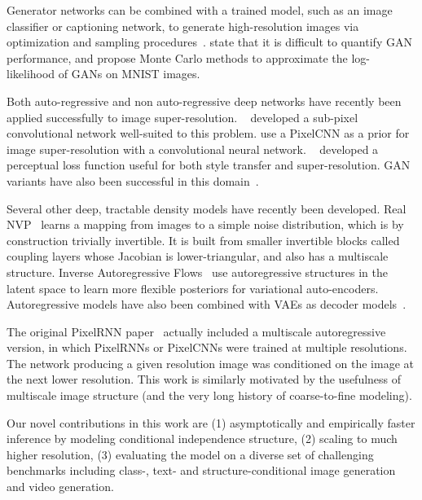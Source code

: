 \documentclass{article}
\begin{document}
Generator networks can be combined with a trained model, such as an image classifier or captioning network, to generate high-resolution images via optimization and sampling procedures~\cite{nguyen2016plug}.
\citet{Wu2017on} state that it is difficult to quantify GAN performance, and propose Monte Carlo methods to approximate the log-likelihood of GANs on MNIST images. 



Both auto-regressive and non auto-regressive deep networks have recently been applied successfully to image super-resolution.
~\citet{shi2016real} developed a sub-pixel convolutional network well-suited to this problem.
\citet{dahl2017pixel} use a PixelCNN as a prior for image super-resolution with a convolutional neural network.
~\citet{johnson2016perceptual} developed a perceptual loss function useful for both style transfer and super-resolution.
GAN variants have also been successful in this domain~\cite{Ledig2016arxiv,sonderby2016amortised}.


Several other deep, tractable density models have recently been developed.
Real NVP~\citep{dinh2016density} learns a mapping from images to a simple noise distribution, which is by construction trivially invertible.
It is built from smaller invertible blocks called coupling layers whose Jacobian is lower-triangular, and also has a multiscale structure.
Inverse Autoregressive Flows~\citep{kingma2016improving} use autoregressive structures in the latent space to learn more flexible posteriors for variational auto-encoders.
Autoregressive models have also been combined with VAEs as decoder models~\citep{gulrajani2016pixelvae}.

The original PixelRNN paper~\citep{Oord2016pixelRNN} actually included a multiscale autoregressive version, in which
PixelRNNs or PixelCNNs were trained at multiple resolutions.
The network producing a given resolution image was conditioned on the image at the next lower resolution.
This work is similarly motivated by the usefulness of multiscale image structure (and the very long history of coarse-to-fine modeling).


Our novel contributions in this work are (1) asymptotically and empirically faster inference by modeling conditional independence structure, (2) scaling to much higher resolution, (3) evaluating the model on a diverse set of challenging benchmarks including class-, text- and structure-conditional image generation and video generation. 
\end{document}
